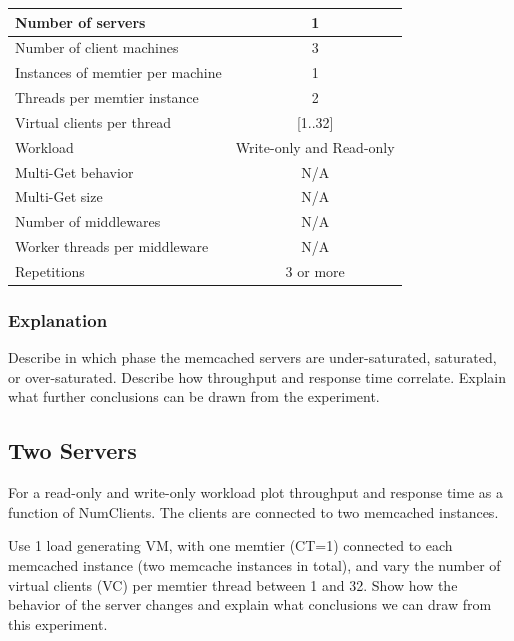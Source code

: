 \documentclass[11pt,a4paper]{article}
\begin{document}
\begin{center}
	\scriptsize{
		\begin{tabular}{|l|c|}
			\hline Number of servers                & 1                        \\ 
			\hline Number of client machines        & 3                        \\ 
			\hline Instances of memtier per machine & 1                        \\ 
			\hline Threads per memtier instance     & 2                        \\
			\hline Virtual clients per thread       & [1..32]                  \\ 
			\hline Workload                         & Write-only and Read-only \\
			\hline Multi-Get behavior               & N/A                      \\
			\hline Multi-Get size                   & N/A                      \\
			\hline Number of middlewares            & N/A                      \\
			\hline Worker threads per middleware    & N/A                      \\
			\hline Repetitions                      & 3 or more                \\ 
			\hline 
		\end{tabular}
	} 
\end{center}

\subsubsection{Explanation}

Describe in which phase the memcached servers are under-saturated, saturated, or over-saturated. Describe how throughput and response time correlate. Explain what further conclusions can be drawn from the experiment.


\subsection{Two Servers}

For a read-only and write-only workload plot throughput and response time as a function of NumClients. The clients are connected to two memcached instances. 

Use 1 load generating VM, with one memtier (CT=1) connected to each memcached instance (two memcache instances in total), and vary the number of virtual clients (VC) per memtier thread between 1 and 32. Show how the behavior of the server changes and explain what conclusions we can draw from this experiment.
\end{document}
